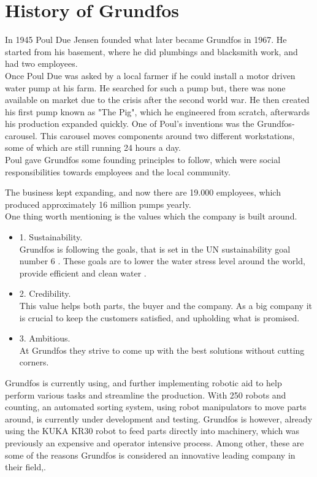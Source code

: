 \section{History of Grundfos} \label{ch:History of Grundfos}

In 1945 Poul Due Jensen founded what later became Grundfos in 1967. He started from his basement, where he did plumbings and blacksmith work, and had two employees\cite{documentray}.\\

Once Poul Due was asked by a local farmer if he could install a motor driven water pump at his farm. He searched for such a pump but, there was none available on market due to the crisis after the second world war. 
He then created his first pump known as "The Pig", which he engineered from scratch, afterwards his production expanded quickly. 
One of Poul's inventions was the Grundfos-carousel. This carousel moves components around two different workstations, some of which are still running 24 hours a day\cite{documentray}.\\

Poul gave Grundfos some founding principles to follow, which were social responsibilities towards employees and the local community.

The business kept expanding, and now there are 19.000 employees, which produced approximately 16 million pumps yearly\cite{1Grundfos}.\\

One thing worth mentioning is the values which the company is built around.\\

\begin{itemize}
   
\item 1. Sustainability.\\ Grundfos is following the goals, that is set in the UN sustainability goal number 6 \cite{Ggoal6}. These goals are to lower the water stress level around the world, provide efficient and clean water \cite{goal6}.\\
\item 2. Credibility.\\ This value helps both parts, the buyer and the company. As a big company it is crucial to keep the customers satisfied, and upholding what is promised.\\
\item 3. Ambitious.\\ At Grundfos they strive to come up with the best solutions without cutting corners.\\
\end{itemize}
Grundfos is currently using, and further implementing robotic aid to help perform various tasks and streamline the production. With 250 robots and counting, an automated sorting system, using robot manipulators to move parts around, is currently under development and testing. Grundfos is however, already using the KUKA KR30 robot to feed parts directly into machinery, which was previously an expensive and operator intensive process. Among other, these are some of the reasons Grundfos is considered an innovative leading company in their field\cite{1Grundfos},\cite{Grundfosrobot}. 


